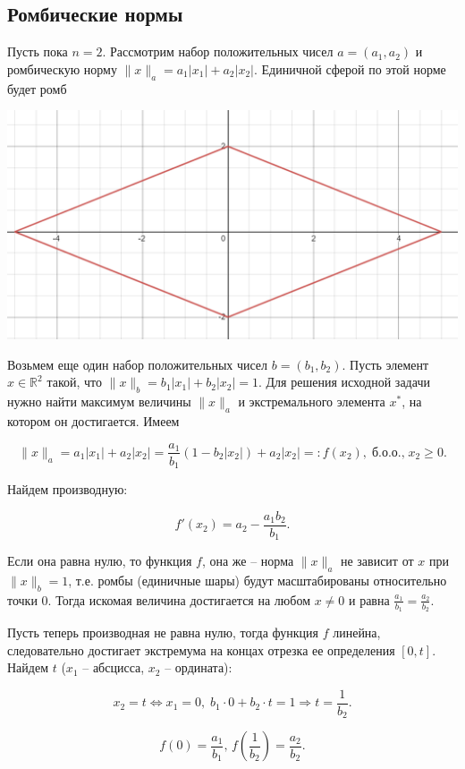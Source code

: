 \documentclass{article}
\begin{document}
\subsection{Ромбические нормы}
Пусть пока $n=2$. Рассмотрим набор положительных чисел $a=(a_1, a_2)$ и ромбическую норму $\|x\|_a = a_1|x_1|+a_2|x_2|$. Единичной сферой по этой норме будет ромб

\begin{center}
\includegraphics[scale = 0.5]{rhombus.png} 
\end{center}

Возьмем еще один набор положительных чисел $b = (b_1, b_2)$. Пусть элемент $x \in \mathbb{R}^2$ такой, что $\|x\|_b = b_1|x_1|+b_2|x_2| = 1$. Для решения исходной задачи нужно найти максимум величины $\|x\|_a$ и экстремального элемента $x^*$, на котором он достигается. Имеем

$$ \|x\|_a = a_1|x_1| + a_2|x_2| = \frac{a_1}{b_1}(1-b_2|x_2|) + a_2|x_2| =: f(x_2), \; \text{б.о.о.,} \; x_2 \geqslant 0. $$

Найдем производную: 

$$ f'(x_2) = a_2 - \frac{a_1b_2}{b_1}. $$

Если она равна нулю, то функция $f$, она же -- норма $\|x\|_a$ не зависит от $x$ при $\|x\|_b = 1$, т.е. ромбы (единичные шары) будут масштабированы относительно точки $0$. Тогда искомая величина достигается на любом $x \neq 0$ и равна $ \frac{a_1}{b_1} = \frac{a_2}{b_2}$.

Пусть теперь производная не равна нулю, тогда функция $f$ линейна, следовательно достигает экстремума на концах отрезка ее определения $[0, t].$ Найдем $t$ ($x_1$ -- абсцисса, $x_2$ -- ордината):

$$ x_2 = t \Leftrightarrow x_1 = 0, \; b_1 \cdot 0 + b_2 \cdot t = 1 \Rightarrow t = \frac{1}{b_2}.$$

$$ f(0) = \frac{a_1}{b_1}, \, f\left(\frac{1}{b_2}\right) = \frac{a_2}{b_2}. $$
\end{document}
